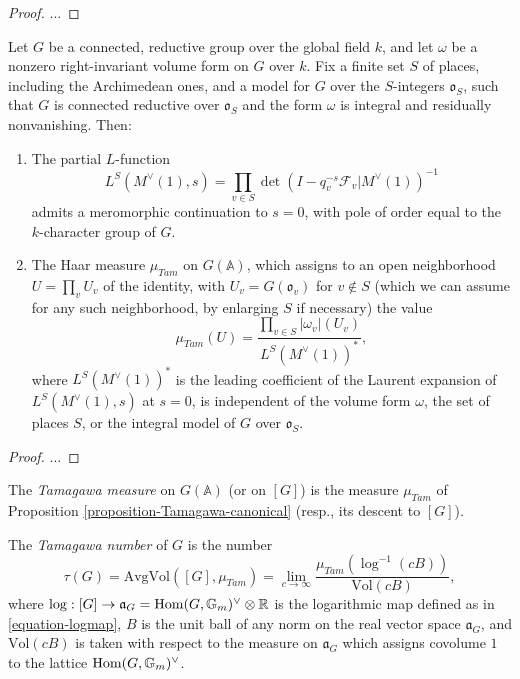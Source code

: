 \begin{proof}
 
 ...
\end{proof}



\begin{proposition}
 \label{proposition-Tamagawa-canonical}
Let $G$ be a connected, reductive group over the global field $k$, and let $\omega$ be a nonzero right-invariant volume form on $G$ over $k$. Fix a finite set $S$ of places, including the Archimedean ones, and a model for $G$ over the $S$-integers $\mathfrak o_S$, such that $G$ is connected reductive over $\mathfrak o_S$ and the form $\omega$ is integral and residually nonvanishing. Then:
\begin{enumerate}
 \item The partial $L$-function 
 $$ L^S(M^\vee(1), s)= \prod_{v\in S} \det(I- q_v^{-s} \mathcal F_v|M^\vee(1))^{-1}$$
 admits a meromorphic continuation to $s=0$, with pole of order equal to the $k$-character group of $G$.
 \item The Haar measure $\mu_{Tam}$ on $G(\mathbb A)$, which assigns to an open neighborhood $U= \prod_v U_v$ of the identity, with $U_v = G(\mathfrak o_v)$ for $v\notin S$ (which we can assume for any such neighborhood, by enlarging $S$ if necessary) the value 
 $$ \mu_{Tam}(U) = \frac{\prod_{v\in S} |\omega_v|(U_v)}{L^S(M^\vee(1))^* },$$
 where $L^S(M^\vee(1))^*$ is the leading coefficient of the Laurent expansion of $L^S(M^\vee(1),s)$ at $s=0$, is independent of the volume form $\omega$, the set of places $S$, or the integral model of $G$ over $\mathfrak o_S$.
\end{enumerate}

\end{proposition}


\begin{proof}
 ...
\end{proof}





\begin{definition}
 \label{definition-Tamagawa-measure-number}
The {\it Tamagawa measure} on $G(\mathbb A)$ (or on $[G]$) is the measure $\mu_{Tam}$ of Proposition \ref{proposition-Tamagawa-canonical} (resp., its descent to $[G]$).  

The {\it Tamagawa number} of $G$ is the number
\begin{equation}
 \label{equation-Tamagawa-number}
\tau(G) = \text{AvgVol}([G],\mu_{Tam}) = \lim_{c\to\infty} \frac{\mu_{Tam}(\log^{-1}(cB))}{\text{Vol}(cB)},
\end{equation}
where $\log: [G] \to \mathfrak a_G = \mathop{\rm Hom}\nolimits(G, \mathbb G_m)^\vee \otimes \mathbb R$ is the logarithmic map defined as in \eqref{equation-logmap}, $B$ is the unit ball of any norm on the real vector space $\mathfrak a_G$, and $\text{Vol}(cB)$ is taken with respect to the measure on $\mathfrak a_G$ which assigns covolume $1$ to the lattice $\mathop{\rm Hom}\nolimits(G, \mathbb G_m)^\vee$. 
\end{definition}


